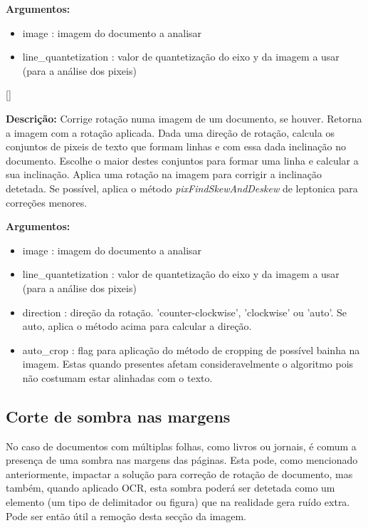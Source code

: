 \textbf{Argumentos:}
\begin{itemize}\setlength\itemsep{-0.3em}
	\vspace{-0.5em}
	\item image : imagem do documento a analisar
	\item line\_quantetization : valor de quantetização do eixo y da imagem a usar (para a análise dos pixeis) 
\end{itemize}

[\normalsize]

\textbf{Descrição:} Corrige rotação numa imagem de um documento, se houver. Retorna a imagem com a rotação aplicada. Dada uma direção de rotação, calcula os conjuntos de pixeis de texto que formam linhas e com essa dada inclinação no documento. Escolhe o maior destes conjuntos para formar uma linha e calcular a sua inclinação. Aplica uma rotação na imagem para corrigir a inclinação detetada. 
Se possível, aplica o método \textit{pixFindSkewAndDeskew} de leptonica para correções menores.

\textbf{Argumentos:}
\begin{itemize}\setlength\itemsep{-0.3em}
	\vspace{-0.5em}
	\item image : imagem do documento a analisar
	\item line\_quantetization : valor de quantetização do eixo y da imagem a usar (para a análise dos pixeis) 
	\item direction : direção da rotação. 'counter-clockwise', 'clockwise' ou 'auto'. Se auto, aplica o método acima para calcular a direção.
	\item auto\_crop : flag para aplicação do método de cropping de possível bainha na imagem. Estas quando presentes afetam consideravelmente o algoritmo pois não costumam estar alinhadas com o texto.
\end{itemize}

\subsection{Corte de sombra nas margens}
\label{contribution_image_cut_argin_shadow}

No caso de documentos com múltiplas folhas, como livros ou jornais, é comum a presença de uma sombra nas margens das páginas. Esta pode, como mencionado anteriormente, impactar a solução para correção de rotação de documento, mas também, quando aplicado OCR, esta sombra poderá ser detetada como um elemento (um tipo de delimitador ou figura) que na realidade gera ruído extra. Pode ser então útil a remoção desta secção da imagem.

